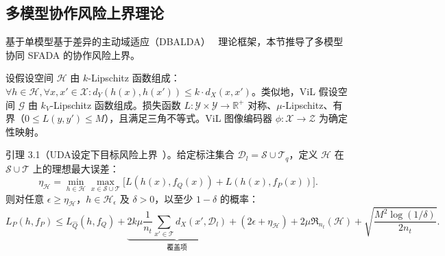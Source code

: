 
\subsection{多模型协作风险上界理论}

基于单模型基于差异的主动域适应（DBALDA）~\cite{mathelin2022discrepancy} 理论框架，本节推导了多模型协同 SFADA 的协作风险上界。

设假设空间 $\mathcal{H}$ 由 $k$-Lipschitz 函数组成：$\forall h\in\mathcal{H},\forall x,x'\in\mathcal{X}: d_Y(h(x),h(x'))\leq k\cdot d_X(x,x')$。类似地，ViL 假设空间 $\mathcal{G}$ 由 $k_V$-Lipschitz 函数组成。损失函数 $L:\mathcal{Y}\times\mathcal{Y}\to\mathbb{R}^+$ 对称、$\mu$-Lipschitz、有界（$0\leq L(y,y')\leq M$），且满足三角不等式。ViL 图像编码器 $\phi:\mathcal{X}\to\mathcal{Z}$ 为确定性映射。

引理 3.1（UDA设定下目标风险上界~\cite{mathelin2022discrepancy}）。给定标注集合 $\mathcal{D}_l=\mathcal{S}\cup\mathcal{T}_q$，定义 $\mathcal{H}$ 在 $\mathcal{S}\cup\mathcal{T}$ 上的理想最大误差：
\begin{equation}
\eta_{\mathcal{H}} = \min_{h\in\mathcal{H}}\max_{x\in\mathcal{S}\cup\mathcal{T}}\big[L(h(x), f_Q(x)) + L(h(x), f_P(x))\big].
\label{eq:eta_H}
\end{equation}
则对任意 $\epsilon\geq\eta_{\mathcal{H}}$，$h\in\mathcal{H}_\epsilon$ 及 $\delta>0$，以至少 $1-\delta$ 的概率：
\begin{equation}
L_P(h,f_P) \leq L_{\hat{Q}}(h,f_Q) + \underbrace{2k\mu\frac{1}{n_t}\sum_{x'\in\mathcal{T}}d_X(x',\mathcal{D}_l)}_{\text{覆盖项}} + (2\epsilon+\eta_{\mathcal{H}}) + 2\mu\mathfrak{R}_{n_t}(\mathcal{H}) + \sqrt{\frac{M^2\log(1/\delta)}{2n_t}}.
\label{eq:uda_bound}
\end{equation}

